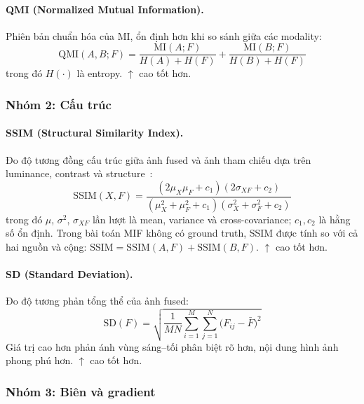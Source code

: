 \paragraph{QMI (Normalized Mutual Information).}
Phiên bản chuẩn hóa của MI, ổn định hơn khi so sánh giữa các modality:
\begin{equation}
\mathrm{QMI}(A,B;F) = \frac{\mathrm{MI}(A;F)}{H(A)+H(F)} + \frac{\mathrm{MI}(B;F)}{H(B)+H(F)}
\end{equation}
trong đó $H(\cdot)$ là entropy. $\uparrow$ cao tốt hơn.

\subsubsection*{Nhóm 2: Cấu trúc}

\paragraph{SSIM (Structural Similarity Index).}
Đo độ tương đồng cấu trúc giữa ảnh fused và ảnh tham chiếu dựa trên luminance, contrast và structure~\cite{wang2004ssim}:
\begin{equation}
\mathrm{SSIM}(X,F) = \frac{(2\mu_X\mu_F+c_1)(2\sigma_{XF}+c_2)}{(\mu_X^2+\mu_F^2+c_1)(\sigma_X^2+\sigma_F^2+c_2)}
\end{equation}
trong đó $\mu$, $\sigma^2$, $\sigma_{XF}$ lần lượt là mean, variance và cross-covariance; $c_1,c_2$ là hằng số ổn định. Trong bài toán MIF không có ground truth, SSIM được tính so với cả hai nguồn và cộng: $\mathrm{SSIM}=\mathrm{SSIM}(A,F)+\mathrm{SSIM}(B,F)$. $\uparrow$ cao tốt hơn.

\paragraph{SD (Standard Deviation).}
Đo độ tương phản tổng thể của ảnh fused:
\begin{equation}
\mathrm{SD}(F) = \sqrt{\frac{1}{MN}\sum_{i=1}^{M}\sum_{j=1}^{N}\bigl(F_{ij}-\bar{F}\bigr)^2}
\end{equation}
Giá trị cao hơn phản ánh vùng sáng--tối phân biệt rõ hơn, nội dung hình ảnh phong phú hơn. $\uparrow$ cao tốt hơn.

\subsubsection*{Nhóm 3: Biên và gradient}

